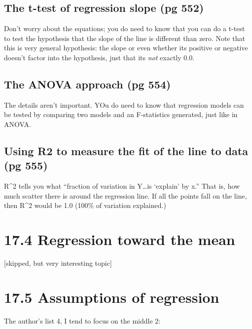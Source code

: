 \documentclass[]{book}
\theoremstyle{definition}
\theoremstyle{definition}
\theoremstyle{definition}
\theoremstyle{remark}
\begin{document}
\subsection{The t-test of regression slope (pg
552)}\label{the-t-test-of-regression-slope-pg-552}

Don't worry about the equations; you do need to know that you can do a
t-test to test the hypothesis that the slope of the line is different
than zero. Note that this is very general hypothesis: the slope or even
whether its positive or negative doesn't factor into the hypothesis,
just that its \emph{not} exactly 0.0.

\subsection{The ANOVA approach (pg
554)}\label{the-anova-approach-pg-554}

The details aren't important. YOu do need to know that regression models
can be tested by comparing two models and an F-statistics generated,
just like in ANOVA.

\subsection{Using R2 to measure the fit of the line to data (pg
555)}\label{using-r2-to-measure-the-fit-of-the-line-to-data-pg-555}

R\^{}2 tells you what ``fraction of variation in Y\ldots{}is `explain'
by x.'' That is, how much scatter there is around the regression line.
If all the points fall on the line, then R\^{}2 would be 1.0 (100\% of
variation explained.)

\section{17.4 Regression toward the
mean}\label{regression-toward-the-mean}

{[}skipped, but very interesting topic{]}

\section{17.5 Assumptions of
regression}\label{assumptions-of-regression}

The author's list 4, I tend to focus on the middle 2:
\end{document}
